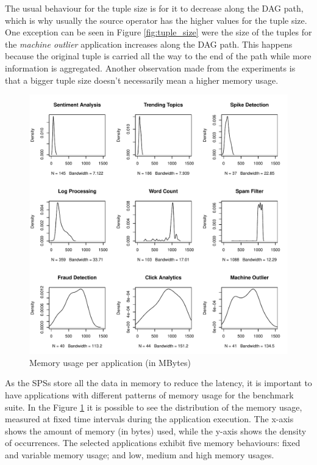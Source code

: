 \documentclass[ppgc,diss,english]{iiufrgs}
\begin{document}
The usual behaviour for the tuple size is for it to decrease along the DAG path, which is why usually the source operator has the higher values for the tuple size. One exception can be seen in Figure \ref{fig:tuple_size} were the size of the tuples for the \emph{machine outlier} application increases along the DAG path. This happens because the original tuple is carried all the way to the end of the path while more information is aggregated. Another observation made from the experiments is that a bigger tuple size doesn't necessarily mean a higher memory usage.

\begin{figure}[ht!]
    \centering
	\includegraphics[width=.8\textwidth]{images/memory_usage.pdf}
	\caption{Memory usage per application (in MBytes)}
	\label{fig:memory_usage}
\end{figure}

As the SPSs store all the data in memory to reduce the latency, it is important to have applications with different patterns of memory usage for the benchmark suite. In the Figure \ref{fig:memory_usage} it is possible to see the distribution of the memory usage, measured at fixed time intervals during the application execution. The x-axis shows the amount of memory (in bytes) used, while the y-axis shows the density of occurrences. The selected applications exhibit five memory behaviours: fixed and variable memory usage; and low, medium and high memory usages.

\end{document}
